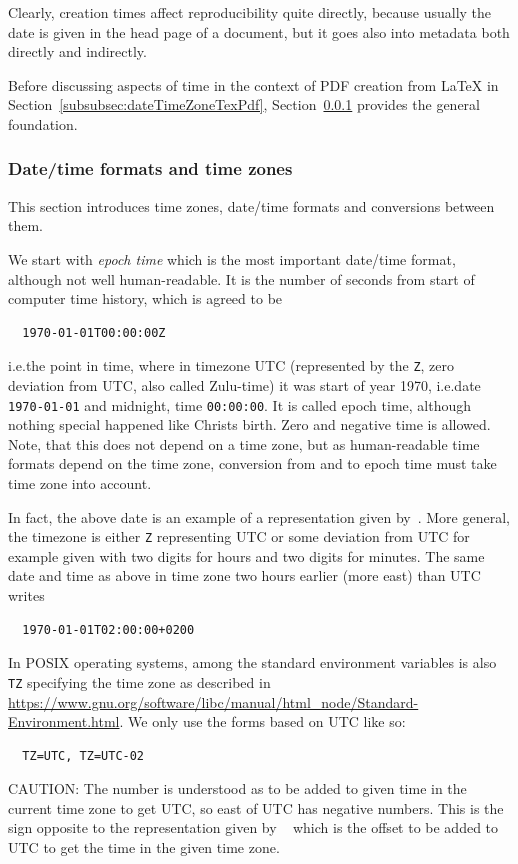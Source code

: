 \documentclass[a4paper]{article}%
\begin{document}
Clearly, creation times affect reproducibility quite directly, 
because usually the date is given in the head page of a document, 
but it goes also into metadata both directly and indirectly. 

Before discussing aspects of time in the context of PDF creation from \LaTeX{} 
in Section~\ref{subsubsec:dateTimeZoneTexPdf}, 
Section~\ref{subsubsec:dateTimeZones} provides the general foundation. 


\subsubsection{Date/time formats and time zones}\label{subsubsec:dateTimeZones}

This section introduces time zones, date/time formats and conversions between them. 

We start with \emph{epoch time} 
which is the most important date/time format, although not well human-readable. 
It is the number of seconds from start of computer time history, 
which is agreed to be 
%
\begin{verbatim}
  1970-01-01T00:00:00Z
\end{verbatim}
%
i.e.\@ the point in time, where in timezone UTC 
(represented by the \texttt Z, zero deviation from UTC, also called Zulu-time) 
it was start of year 1970, i.e.\@ date \texttt{1970-01-01} and midnight, time \texttt{00:00:00}. 
It is called epoch time, although nothing special happened like Christs birth. 
Zero and negative time is allowed. 
Note, that this does not depend on a time zone, 
but as human-readable time formats depend on the time zone, 
conversion from and to epoch time must take time zone into account. 

In fact, the above date is an example of a representation given by~\cite{ISO8601-1}. 
More general, the timezone is either \texttt Z representing UTC 
or some deviation from UTC for example given with two digits for hours and two digits for minutes. 
The same date and time as above in time zone two hours earlier (more east) than UTC writes 
%
\begin{verbatim}
  1970-01-01T02:00:00+0200
\end{verbatim}

In POSIX operating systems, among the standard environment variables is also \texttt{TZ} 
specifying the time zone as described in 
\url{https://www.gnu.org/software/libc/manual/html_node/Standard-Environment.html}. 
We only use the forms based on UTC like so: 
%
\begin{verbatim}
  TZ=UTC, TZ=UTC-02
\end{verbatim}
%
CAUTION\@: 
The number is understood as to be added to given time in the current time zone 
to get UTC, so east of UTC has negative numbers. 
This is the sign opposite to the representation given by ~\cite{ISO8601-1} 
which is the offset to be added to UTC to get the time in the given time zone. 
\end{document}
